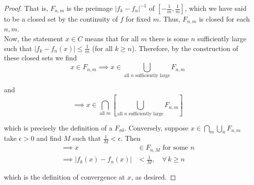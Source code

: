 \documentclass[12pt]{article}
\newlength\tindent
\renewcommand{\indent}{\hspace*{\tindent}}
\begin{document}
\begin{proof}
\indent That is, $F_{n,m}$ is the preimage $|f_k - f_n|^{-1}$ of $\left[ -\frac{1}{m}, \frac{1}{m} \right]$, which we have said to be a closed set by the continuity of $f$ for fixed $m$. Thus, $F_{n,m}$ is closed for each $n, m$. \\

\indent Now, the statement $x \in C$ means that for all $m$ there is some $n$ sufficiently large such that $|f_k - f_n(x)| \leq \frac{1}{m}$ (for all $k \geq n$). Therefore, by the construction of these closed sets we find
\begin{equation*}
	x \in F_{n,m} \implies x \in \bigcup_{\text{all $n$ sufficiently large}} F_{n,m}
\end{equation*}

and
\begin{equation*}
	\implies x \in \bigcap_{\text{all $m$}} \left[ \bigcup_{\text{all $n$ sufficiently large}} F_{n,m} \right]
\end{equation*}

which is precisely the definition of a $F_{\sigma\delta}$. Conversely, suppose $x \in \bigcap_m \bigcup_n F_{n,m}$ take $\epsilon > 0$ and find $M$ such that $\frac{1}{M} < \epsilon$. Then
\begin{align*}
	\implies x &\in F_{n,M} \text{ for some } n \\
	\implies |f_k(x) - f_n(x)| &< \frac{1}{M}, \quad \forall\,k\geq n
\end{align*}

which is the definition of convergence at $x$, as desired.
\end{proof}
\end{document}
